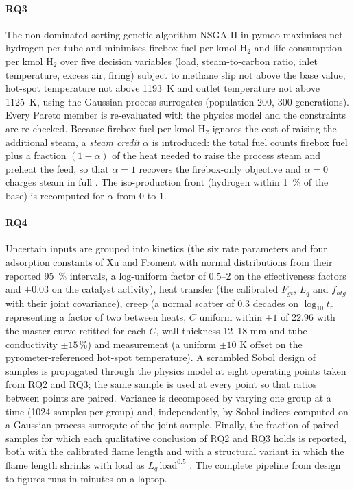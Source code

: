 \paragraph{RQ3} The non-dominated sorting genetic algorithm NSGA-II \cite{deb2002} in pymoo \cite{blank2020} maximises net hydrogen
per tube and minimises firebox fuel per kmol H$_2$ and life consumption per kmol H$_2$ over five decision variables (load,
steam-to-carbon ratio, inlet temperature, excess air, firing) subject to methane slip not above the base value, hot-spot
temperature not above \SI{1193}{K}  and outlet
temperature not above \SI{1125}{K}, using the Gaussian-process surrogates (population 200, 300 generations). Every Pareto member is
re-evaluated with the physics model and the constraints are re-checked. Because firebox fuel per kmol H$_2$ ignores the cost of
raising the additional steam, a \emph{steam credit} $\alpha$ is introduced: the total fuel counts firebox fuel plus a fraction
$(1-\alpha)$ of the heat needed to raise the process steam and preheat the feed, so that $\alpha = 1$ recovers the firebox-only
objective and $\alpha = 0$ charges steam in full .
The iso-production front (hydrogen within \SI{1}{\percent} of the base) is recomputed for $\alpha$ from 0 to 1.

\paragraph{RQ4} \label{sec:uq} Uncertain inputs are grouped into kinetics (the six rate parameters and four adsorption constants of
Xu and Froment with normal distributions from their reported \SI{95}{\percent} intervals, a log-uniform factor of 0.5--2 on the
effectiveness factors and $\pm 0.03$ on the catalyst activity), heat transfer (the calibrated $F_{gt}$, $L_q$ and $f_{htg}$ with
their joint covariance), creep (a normal scatter of 0.3 decades on $\log_{10} t_r$ representing a factor of two between heats, $C$
uniform within $\pm 1$ of 22.96 with the master curve refitted for each $C$, wall thickness 12--18 mm and tube conductivity
$\pm 15$\,\%) and measurement (a uniform $\pm 10$ K offset on the pyrometer-referenced hot-spot temperature). A scrambled Sobol
design of \nMC{} samples is propagated through the physics model at eight operating points taken from RQ2 and RQ3; the same sample
is used at every point so that ratios between points are paired. Variance is decomposed by varying one group at a time (1024
samples per group) and, independently, by Sobol indices computed on a Gaussian-process surrogate of the joint sample. Finally, the
fraction of paired samples for which each qualitative conclusion of RQ2 and RQ3 holds is reported, both with the calibrated flame
length and with a structural variant in which the flame length shrinks with load as $L_q\,\mathrm{load}^{0.5}$
. The complete pipeline from design to figures runs in
\pipelineMin{} minutes on a laptop.

